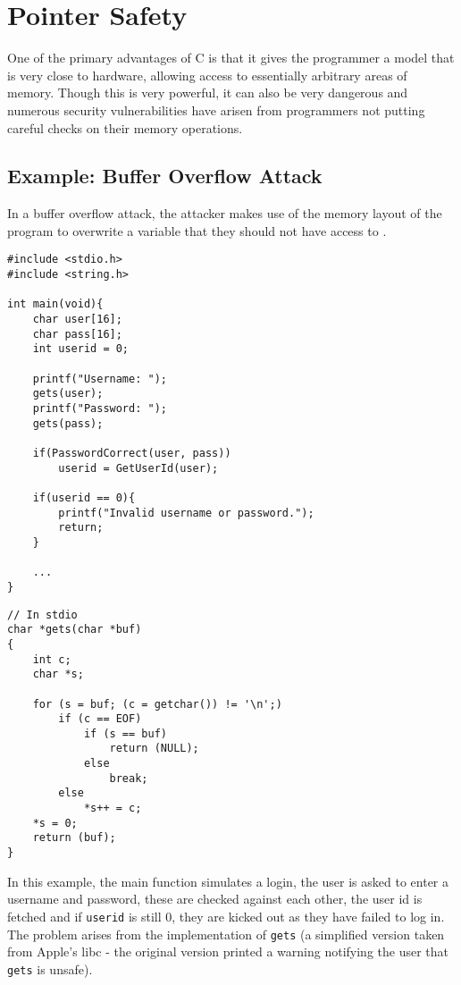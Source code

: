 \section{Pointer Safety}

One of the primary advantages of C is that it gives the programmer a model that is very close to hardware, allowing access to essentially arbitrary areas of memory.
Though this is very powerful, it can also be very dangerous and numerous security vulnerabilities have arisen from programmers not putting careful checks on their memory operations.

\subsection{Example: Buffer Overflow Attack}

In a buffer overflow attack, the attacker makes use of the memory layout of the program to overwrite a variable that they should not have access to \cite{bufferOverflow}.

\begin{verbatim}
#include <stdio.h>
#include <string.h>

int main(void){
    char user[16];
    char pass[16];
    int userid = 0;

    printf("Username: ");
    gets(user);
    printf("Password: ");
    gets(pass);

    if(PasswordCorrect(user, pass))
        userid = GetUserId(user);

    if(userid == 0){
        printf("Invalid username or password.");
        return;
    }

    ...
}
\end{verbatim}

\begin{verbatim}
// In stdio
char *gets(char *buf)
{
    int c;
    char *s;

    for (s = buf; (c = getchar()) != '\n';)
        if (c == EOF)
            if (s == buf)
                return (NULL);
            else
                break;
        else
            *s++ = c;
    *s = 0;
    return (buf);
}
\end{verbatim}

In this example, the main function simulates a login, the user is asked to enter a username and password, these are checked against each other, the user id is fetched and if \verb!userid! is still 0, they are kicked out as they have failed to log in.
The problem arises from the implementation of \verb!gets! (a simplified version taken from Apple's libc - the original version printed a warning notifying the user that \verb!gets! is unsafe).

